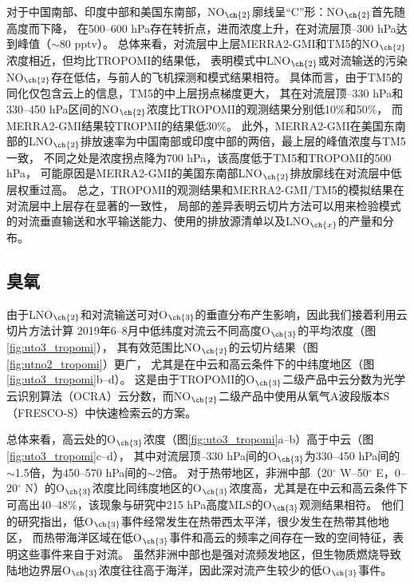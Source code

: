 对于中国南部、印度中部和美国东南部，NO$_{\ch{2}}$廓线呈“C”形：NO$_{\ch{2}}$首先随高度而下降，
在500--600 hPa存在转折点，进而浓度上升，在对流层顶--300 hPa达到峰值（$\sim$80 pptv）。
总体来看，对流层中上层MERRA2-GMI和TM5的NO$_{\ch{2}}$浓度相近，但均比TROPOMI的结果低，
表明模式中LNO$_{\ch{2}}$或对流输送的污染NO$_{\ch{2}}$存在低估，与前人的飞机探测和模式结果相符\citep{Laughner.2019a}。
具体而言，由于TM5的同化仅包含云上的信息，TM5的中上层拐点梯度更大，
其在对流层顶--330 hPa和330--450 hPa区间的NO$_{\ch{2}}$浓度比TROPOMI的观测结果分别低10\%和50\%，
而MERRA2-GMI结果较TROPMI的结果低30\%。
此外，MERRA2-GMI在美国东南部的LNO$_{\ch{2}}$排放速率为中国南部或印度中部的两倍，最上层的峰值浓度与TM5一致，
不同之处是浓度拐点降为700 hPa，该高度低于TM5和TROPOMI的500 hPa，
可能原因是MERRA2-GMI的美国东南部LNO$_{\ch{2}}$排放廓线在对流层中低层权重过高。
总之，TROPOMI的观测结果和MERRA2-GMI/TM5的模拟结果在对流层中上层存在显著的一致性，
局部的差异表明云切片方法可以用来检验模式的对流垂直输送和水平输送能力、使用的排放源清单以及LNO$_{\ch{x}}$的产量和分布。


\subsection{臭氧} \label{sec:o3_profile}

由于LNO$_{\ch{2}}$和对流输送可对O$_{\ch{3}}$的垂直分布产生影响，因此我们接着利用云切片方法计算
2019年6--8月中低纬度对流云不同高度O$_{\ch{3}}$的平均浓度（图\ref{fig:uto3_tropomi}），
其有效范围比NO$_{\ch{2}}$的云切片结果（图\ref{fig:utno2_tropomi}）更广，
尤其是在中云和高云条件下的中纬度地区（图\ref{fig:uto3_tropomi}b--d）。
这是由于TROPOMI的O$_{\ch{3}}$二级产品中云分数为光学云识别算法（OCRA）云分数，而NO$_{\ch{2}}$二级产品中使用从氧气A波段版本S（FRESCO-S）中快速检索云的方案。

总体来看，高云处的O$_{\ch{3}}$浓度（图\ref{fig:uto3_tropomi}a--b）高于中云（图\ref{fig:uto3_tropomi}c--d），
其中对流层顶--330 hPa间的O$_{\ch{3}}$为330--450 hPa间的$\sim$1.5倍，为450--570 hPa间的$\sim$2倍。
对于热带地区，非洲中部（20$^{\circ}$ W--50$^{\circ}$ E，0--20$^{\circ}$ N）的O$_{\ch{3}}$浓度比同纬度地区的O$_{\ch{3}}$浓度高，尤其是在中云和高云条件下可高出40--48\%，该现象与\citet{Cooper.2013}研究中215 hPa高度MLS的O$_{\ch{3}}$观测结果相符。
他们的研究指出，低O$_{\ch{3}}$事件经常发生在热带西太平洋，很少发生在热带其他地区，
而热带海洋区域在低O$_{\ch{3}}$事件和高云的频率之间存在一致的空间特征，表明这些事件来自于对流。
虽然非洲中部也是强对流频发地区，但生物质燃烧导致陆地边界层O$_{\ch{3}}$浓度往往高于海洋\citep{Thompson.2001,Anderson.2016}，因此深对流产生较少的低O$_{\ch{3}}$事件。

